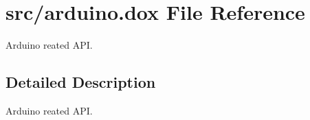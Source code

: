 \hypertarget{arduino_8dox}{}\section{src/arduino.dox File Reference}
\label{arduino_8dox}


Arduino reated A\+P\+I.  




\subsection{Detailed Description}
Arduino reated A\+P\+I. 

